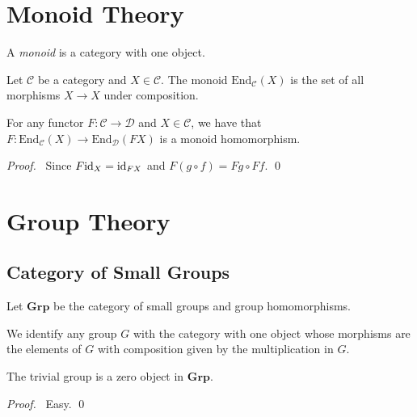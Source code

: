 \newcommand{\ket}[1]{\ensuremath{\left| {#1} \right\rangle}}

\chapter{Monoid Theory}

\begin{df}[Monoid]
A \emph{monoid} is a category with one object.
\end{df}

\begin{df}
Let $\mathcal{C}$ be a category and $X \in \mathcal{C}$. The monoid $\mathrm{End}_\mathcal{C}(X)$ is the set of all morphisms $X \rightarrow X$ under composition.
\end{df}

\begin{prop}
For any functor $F : \mathcal{C} \rightarrow \mathcal{D}$ and $X \in \mathcal{C}$, we have that $F : \mathrm{End}_\mathcal{C}(X) \rightarrow \mathrm{End}_\mathcal{D}(FX)$ is a monoid homomorphism.
\end{prop}

\begin{proof}
\pf\ Since $F \mathrm{id}_{X} = \mathrm{id}_{FX}$ and $F(g \circ f) = Fg \circ Ff$. \qed
\end{proof}

\chapter{Group Theory}

\section{Category of Small Groups}

\begin{df}
Let $\mathbf{Grp}$ be the category of small groups and group homomorphisms.
\end{df}

\begin{df}
We identify any group $G$ with the category with one object whose morphisms are the elements of $G$ with composition given by the multiplication in $G$.
\end{df}

\begin{prop}
The trivial group is a zero object in $\mathbf{Grp}$.
\end{prop}

\begin{proof}
\pf\ Easy. \qed
\end{proof}

